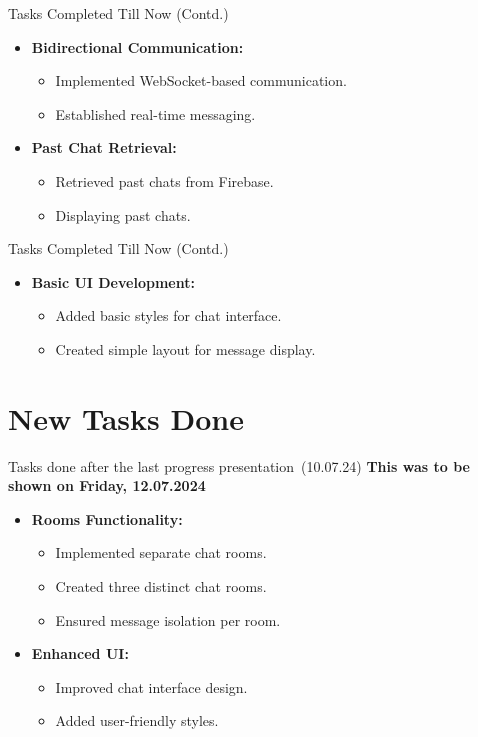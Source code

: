 \documentclass{beamer}
\begin{document}
\begin{frame}{Tasks Completed Till Now (Contd.)}
    \begin{itemize}
        \item \textbf{Bidirectional Communication:}
        \begin{itemize}
            \item Implemented WebSocket-based communication.
            \item Established real-time messaging.
        \end{itemize}
        \item \textbf{Past Chat Retrieval:}
        \begin{itemize}
            \item Retrieved past chats from Firebase.
            \item Displaying past chats.
        \end{itemize}
    \end{itemize}
\end{frame}

\begin{frame}{Tasks Completed Till Now (Contd.)}
    \begin{itemize}
        \item \textbf{Basic UI Development:}
        \begin{itemize}
            \item Added basic styles for chat interface.
            \item Created simple layout for message display.
        \end{itemize}
    \end{itemize}
\end{frame}

\section{New Tasks Done}

\begin{frame}{Tasks done after the last progress presentation (10.07.24)}
    \textbf{This was to be shown on Friday, 12.07.2024}
    \begin{itemize}
        \item \textbf{Rooms Functionality:}
        \begin{itemize}
            \item Implemented separate chat rooms.
            \item Created three distinct chat rooms.
            \item Ensured message isolation per room.
        \end{itemize}
        \item \textbf{Enhanced UI:}
        \begin{itemize}
            \item Improved chat interface design.
            \item Added user-friendly styles.
        \end{itemize}
    \end{itemize}
\end{frame}
\end{document}
